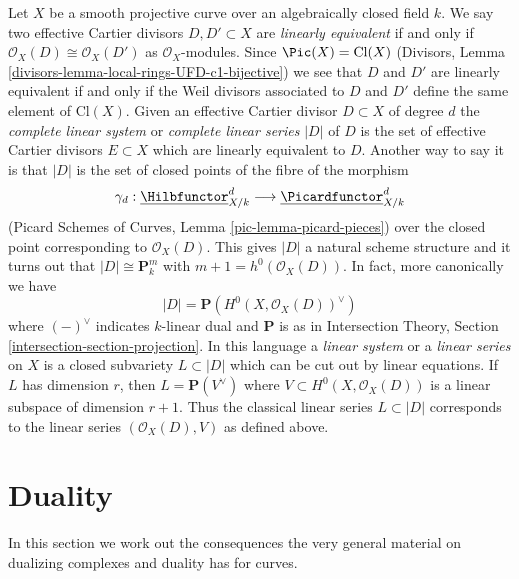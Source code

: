 \begin{remark}
\label{remark-classical-linear-series}
Let $X$ be a smooth projective curve over an algebraically closed field $k$.
We say two effective Cartier divisors $D, D' \subset X$ are
{\it linearly equivalent} if and only if
$\mathcal{O}_X(D) \cong \mathcal{O}_X(D')$ as $\mathcal{O}_X$-modules.
Since $\Pic(X) = \text{Cl}(X)$
(Divisors, Lemma \ref{divisors-lemma-local-rings-UFD-c1-bijective})
we see that $D$ and $D'$ are linearly equivalent
if and only if the Weil divisors associated to
$D$ and $D'$ define the same element of $\text{Cl}(X)$.
Given an effective Cartier divisor $D \subset X$ of degree $d$ the
{\it complete linear system} or {\it complete linear series} $|D|$ of $D$
is the set of effective Cartier divisors $E \subset X$
which are linearly equivalent to $D$.
Another way to say it is that $|D|$ is the set of closed
points of the fibre of the morphism
$$
\gamma_d :
\underline{\Hilbfunctor}^d_{X/k}
\longrightarrow
\underline{\Picardfunctor}^d_{X/k}
$$
(Picard Schemes of Curves, Lemma \ref{pic-lemma-picard-pieces})
over the closed point corresponding to $\mathcal{O}_X(D)$.
This gives $|D|$ a natural scheme structure and it
turns out that $|D| \cong \mathbf{P}^m_k$ with
$m + 1 = h^0(\mathcal{O}_X(D))$. In fact, more canonically we have
$$
|D| = \mathbf{P}(H^0(X, \mathcal{O}_X(D))^\vee)
$$
where $(-)^\vee$ indicates $k$-linear dual and $\mathbf{P}$ is as
in Intersection Theory, Section \ref{intersection-section-projection}.
In this language a {\it linear system} or a {\it linear series} on
$X$ is a closed subvariety $L \subset |D|$ which can be cut out by
linear equations. If $L$ has dimension $r$, then $L = \mathbf{P}(V^\vee)$
where $V \subset H^0(X, \mathcal{O}_X(D))$ is a linear subspace
of dimension $r + 1$. Thus the classical linear series
$L \subset |D|$ corresponds to the linear series $(\mathcal{O}_X(D), V)$
as defined above.
\end{remark}







\section{Duality}
\label{section-duality}

\noindent
In this section we work out the consequences the very general
material on dualizing complexes and duality has for curves.

